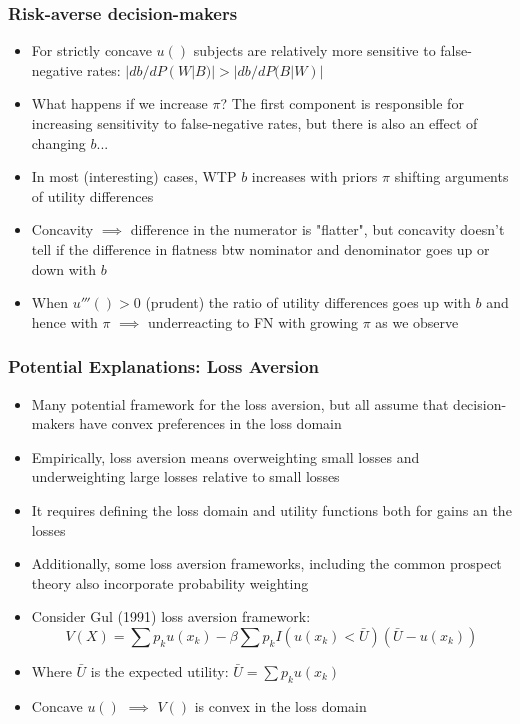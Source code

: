\documentclass[11pt,hyperref={bookmarks=false}]{beamer}
\begin{document}
\begin{frame}
\frametitle{Risk-averse decision-makers}
\begin{itemize}
\item For strictly concave $u()$ subjects  are relatively more sensitive to false-negative rates: $|db/dP(W|B)|>|db/dP(B|W)|$
\item What happens if we increase $\pi$? The first component is responsible for increasing sensitivity to false-negative rates, but there is also an effect of changing $b$...
\item In most (interesting) cases, WTP $b$ increases with priors $\pi$ shifting arguments of utility differences
\item Concavity $\implies$ difference in the numerator is "flatter", but concavity doesn't tell if the difference in flatness btw nominator and denominator goes up or down with $b$
\item When $u'''()>0$ (prudent) the ratio of utility differences goes up with $b$ and hence with $\pi$ $\implies$ underreacting to FN with growing $\pi$ as we observe
\end{itemize}
\end{frame}


\begin{frame}
\frametitle{Potential Explanations: Loss Aversion}
\begin{itemize}
\item Many potential framework for the loss aversion, but all assume that decision-makers have convex preferences in the loss domain
\item Empirically, loss aversion means overweighting small losses and underweighting large losses relative to small losses
\item It requires defining the loss domain and utility functions both for gains an the losses
\item Additionally, some loss aversion frameworks, including the common prospect theory also incorporate probability weighting
\item Consider Gul (1991) loss aversion framework:
$$V(X)=\sum p_k u(x_k)-\beta \sum p_k I(u(x_k)<\bar U)(\bar U-u(x_k))$$
\item Where $\bar U$ is the expected utility: $\bar U=\sum p_k u(x_k)$
\item Concave $u()$ $\implies$ $V()$ is convex in the loss domain
\end{itemize}
\end{frame}
\end{document}
